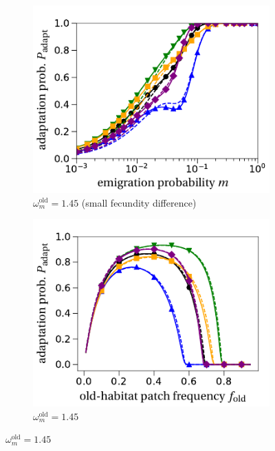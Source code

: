 \documentclass[11pt]{article}
\begin{document}
\begin{figure}[t!]
\begin{subfigure}{.5\textwidth}
 		 \centering
 		 \includegraphics[width=\linewidth]{fig3c.pdf}
  		\caption{$\omega^\text{old}_m=1.45$  (small fecundity difference)}
	\end{subfigure}%
	\begin{subfigure}{.5\textwidth}
  		\centering
  		\includegraphics[width=\linewidth]{fig3d.pdf}
  		\caption{$\omega^\text{old}_m=1.45$}
	\end{subfigure}

\end{figure}
\end{document}
